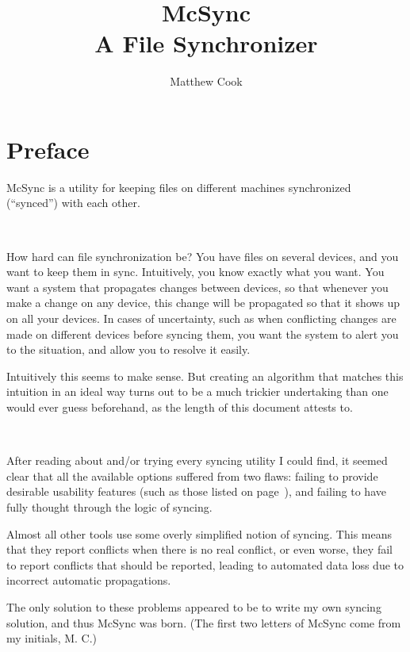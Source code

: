 \documentclass{book}
\title{McSync
\\ A File Synchronizer
}
\author{Matthew Cook}
\begin{document}
\pagestyle{empty}



\maketitle



\tableofcontents




\chapter*{Preface}
\pagestyle{headings}

McSync is a utility for keeping files on different machines synchronized (``synced'') with each other.

~

How hard can file synchronization be?
You have files on several devices, and you want to keep them in sync.
Intuitively, you know exactly what you want.
You want a system that propagates changes between devices,
so that whenever you make a change on any device,
this change will be propagated so that it shows up on all your devices.
In cases of uncertainty,
such as when conflicting changes are made on different devices before syncing them,
you want the system to alert you to the situation, and allow you to resolve it easily.

Intuitively this seems to make sense.
But creating an algorithm that matches this intuition in an ideal way
turns out to be a much trickier undertaking than one would ever guess beforehand,
as the length of this document attests to.

~

After reading about and/or trying every syncing utility I could find,
it seemed clear that all the available options suffered from two flaws:
failing to provide desirable usability features
(such as those listed on page~\pageref{features}),
and failing to have fully thought through the logic of syncing.

Almost all other tools use some overly simplified notion of syncing.
This means that they report conflicts when there is no real conflict,
or even worse,
they fail to report conflicts that should be reported,
leading to automated data loss due to incorrect automatic propagations.

The only solution to these problems
appeared to be to write my own syncing solution,
and thus McSync was born.
(The first two letters of McSync come from my initials, M. C.)
\end{document}
